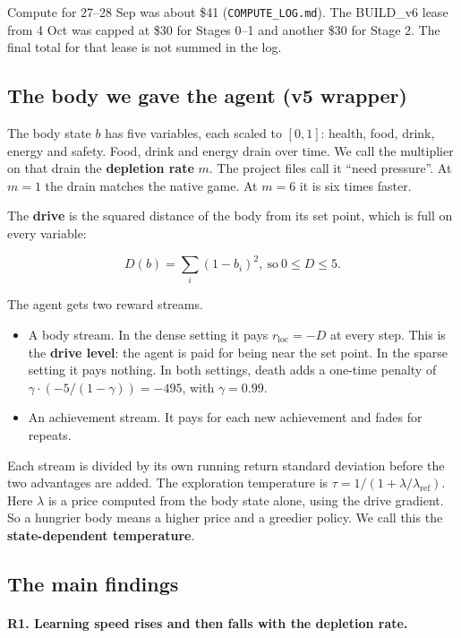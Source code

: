 \documentclass[11pt]{article}
\begin{document}
Compute for 27--28 Sep was about \$41 (\texttt{COMPUTE\_LOG.md}). The BUILD\_v6 lease from 4 Oct was capped at \$30 for Stages 0--1 and another \$30 for Stage 2. The final total for that lease is not summed in the log.

\subsection{The body we gave the agent (v5 wrapper)}

The body state $b$ has five variables, each scaled to $[0, 1]$: health, food, drink, energy and safety. Food, drink and energy drain over time. We call the multiplier on that drain the \textbf{depletion rate} $m$. The project files call it ``need pressure''. At $m = 1$ the drain matches the native game. At $m = 6$ it is six times faster.

The \textbf{drive} is the squared distance of the body from its set point, which is full on every variable:

\[
D(b) = \sum_i (1 - b_i)^2, \ \text{so} \ 0 \le D \le 5.
\]

The agent gets two reward streams.

\begin{itemize}
\item A body stream. In the dense setting it pays $r_{\text{loc}} = -D$ at every step. This is the \textbf{drive level}: the agent is paid for being near the set point. In the sparse setting it pays nothing. In both settings, death adds a one-time penalty of $\gamma \cdot (-5/(1-\gamma)) = -495$, with $\gamma = 0.99$.
\item An achievement stream. It pays for each new achievement and fades for repeats.
\end{itemize}

Each stream is divided by its own running return standard deviation before the two advantages are added. The exploration temperature is $\tau = 1/(1 + \lambda/\lambda_{\text{ref}})$. Here $\lambda$ is a price computed from the body state alone, using the drive gradient. So a hungrier body means a higher price and a greedier policy. We call this the \textbf{state-dependent temperature}.

\subsection{The main findings}

\paragraph{R1. Learning speed rises and then falls with the depletion rate.}
\end{document}
